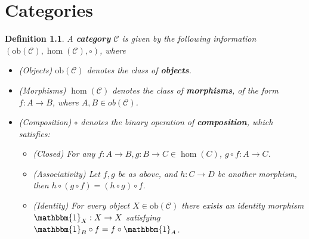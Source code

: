 \documentclass[11pt]{report}
\newcommand{\mcC}{\mathcal{C}}
\newcommand{\ob}{\text{ob}}
\newtheorem{defn}[thm]{Definition} %
\begin{document}
\chapter{Categories}
\begin{defn}
  A \textbf{category} $\mcC$ is given by the following information $(\ob(\mcC), \hom(\mcC), \circ)$, where
  \begin{itemize}
  \item (Objects) $\ob(\mcC)$ denotes the class of \textbf{objects}. \\
  \item (Morphisms) $\hom(\mcC)$ denotes the class of \textbf{morphisms}, of the form $f:A \to B$, where $A, B \in ob(\mcC)$. \\
  \item (Composition) $\circ$ denotes the binary operation of \textbf{composition}, which satisfies:
    \begin{itemize}
    \item (Closed) For any $f: A \to B, g:B \to C \in \hom(C)$, $g \circ f: A \to C$. \\
    \item (Associativity) Let $f,g$ be as above, and $h:C \to D$ be another morphism, then $h \circ (g \circ f) = (h \circ g) \circ f$. \\
    \item (Identity) For every object $X \in \ob(\mcC)$ there exists an identity morphism $\mathbbm{1}_X:X \to X$ satisfying
      $\mathbbm{1}_B \circ f = f \circ \mathbbm{1}_A$.
    \end{itemize}
  \end{itemize}
\end{defn}
\end{document}
